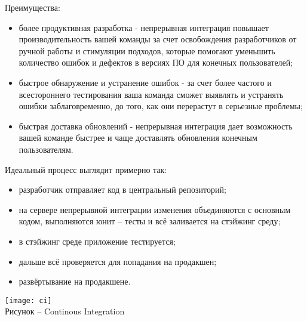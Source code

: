 Преимущества:
\begin{itemize}
\item более продуктивная разработка - непрерывная интеграция повышает производительность вашей команды за счет освобождения разработчиков от ручной работы и стимуляции подходов, которые помогают уменьшить количество ошибок и дефектов в версиях ПО для конечных пользователей;
\item быстрое обнаружение и устранение ошибок - за счет более частого и всестороннего тестирования ваша команда сможет выявлять и устранять ошибки заблаговременно, до того, как они перерастут в серьезные проблемы;
\item быстрая доставка обновлений - непрерывная интеграция дает возможность вашей команде быстрее и чаще доставлять обновления конечным пользователям.
\end{itemize}
\vspace{\baselineskip}

Идеальный процесс выглядит примерно так:
\begin{itemize}
\item разработчик отправляет код в центральный репозиторий;
\item на сервере непрерывной интеграции изменения объединяются с основным кодом, выполняются юнит – тесты и всё заливается на стэйжинг среду;
\item в стэйжинг среде приложение тестируется;
\item дальше всё проверяется для попадания на продакшен;
\item развёртывание на продакшене.
\end{itemize}
\vspace{\baselineskip}

\begin{center}
\texttt{[image: ci]}\\
Рисунок -- Continous Integration\\
\end{center}

